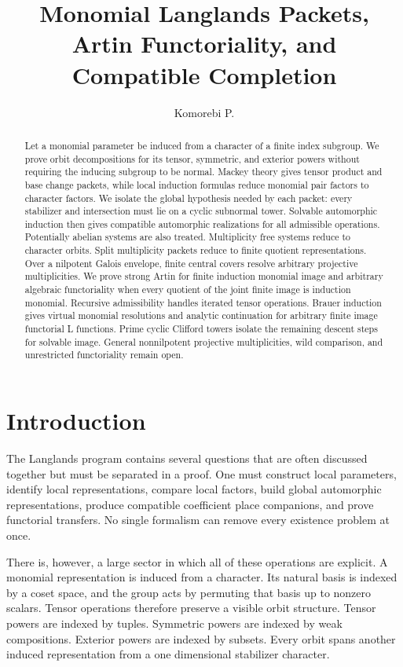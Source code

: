 \documentclass{aomart}
\title[Monomial Langlands packets]{Monomial Langlands Packets, Artin Functoriality, and Compatible Completion}
\author[Komorebi P.]{Komorebi P.}
\theoremstyle{definition}
\theoremstyle{remark}
\begin{document}
\begin{abstract}
Let a monomial parameter be induced from a character of a finite index subgroup. We prove orbit decompositions for its tensor, symmetric, and exterior powers without requiring the inducing subgroup to be normal. Mackey theory gives tensor product and base change packets, while local induction formulas reduce monomial pair factors to character factors. We isolate the global hypothesis needed by each packet: every stabilizer and intersection must lie on a cyclic subnormal tower. Solvable automorphic induction then gives compatible automorphic realizations for all admissible operations. Potentially abelian systems are also treated. Multiplicity free systems reduce to character orbits. Split multiplicity packets reduce to finite quotient representations. Over a nilpotent Galois envelope, finite central covers resolve arbitrary projective multiplicities. We prove strong Artin for finite induction monomial image and arbitrary algebraic functoriality when every quotient of the joint finite image is induction monomial. Recursive admissibility handles iterated tensor operations. Brauer induction gives virtual monomial resolutions and analytic continuation for arbitrary finite image functorial L functions. Prime cyclic Clifford towers isolate the remaining descent steps for solvable image. General nonnilpotent projective multiplicities, wild comparison, and unrestricted functoriality remain open.
\end{abstract}
\maketitle
\thispagestyle{plain}

\section{Introduction}\label{sec:introduction}

The Langlands program contains several questions that are often discussed together but must be separated in a proof. One must construct local parameters, identify local representations, compare local factors, build global automorphic representations, produce compatible coefficient place companions, and prove functorial transfers. No single formalism can remove every existence problem at once.

There is, however, a large sector in which all of these operations are explicit. A monomial representation is induced from a character. Its natural basis is indexed by a coset space, and the group acts by permuting that basis up to nonzero scalars. Tensor operations therefore preserve a visible orbit structure. Tensor powers are indexed by tuples. Symmetric powers are indexed by weak compositions. Exterior powers are indexed by subsets. Every orbit spans another induced representation from a one dimensional stabilizer character.
\end{document}
